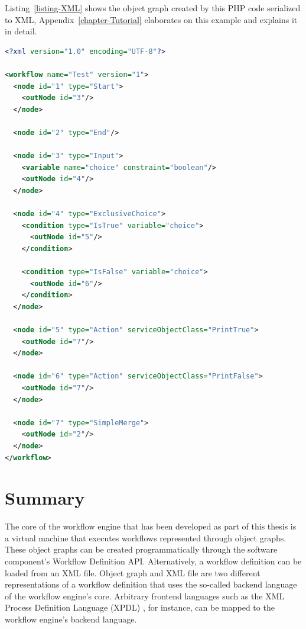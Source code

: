 Listing~\ref{listing-XML} shows the object graph created by this PHP code
serialized to XML, Appendix~\ref{chapter-Tutorial} elaborates on this example
and explains it in detail.

\begin{lstlisting}[language=XML,firstnumber=1,stepnumber=100,float,caption={Workflow specification in XML markup},label=listing-XML]
<?xml version="1.0" encoding="UTF-8"?>

<workflow name="Test" version="1">
  <node id="1" type="Start">
    <outNode id="3"/>
  </node>

  <node id="2" type="End"/>

  <node id="3" type="Input">
    <variable name="choice" constraint="boolean"/>
    <outNode id="4"/>
  </node>

  <node id="4" type="ExclusiveChoice">
    <condition type="IsTrue" variable="choice">
      <outNode id="5"/>
    </condition>

    <condition type="IsFalse" variable="choice">
      <outNode id="6"/>
    </condition>
  </node>

  <node id="5" type="Action" serviceObjectClass="PrintTrue">
    <outNode id="7"/>
  </node>

  <node id="6" type="Action" serviceObjectClass="PrintFalse">
    <outNode id="7"/>
  </node>

  <node id="7" type="SimpleMerge">
    <outNode id="2"/>
  </node>
</workflow>
\end{lstlisting}

\clearpage
\section{Summary}

The core of the workflow engine that has been developed as part of this thesis
is a virtual machine that executes workflows represented through object graphs.
These object graphs can be created programmatically through the software
component's Workflow Definition API. Alternatively, a workflow definition can
be loaded from an XML file. Object graph and XML file are two different
representations of a workflow definition that uses the so-called backend
language of the workflow engine's core. Arbitrary frontend languages such as
the XML Process Definition Language (XPDL) \cite{WfMC05}, for instance, can be
mapped to the workflow engine's backend language.
